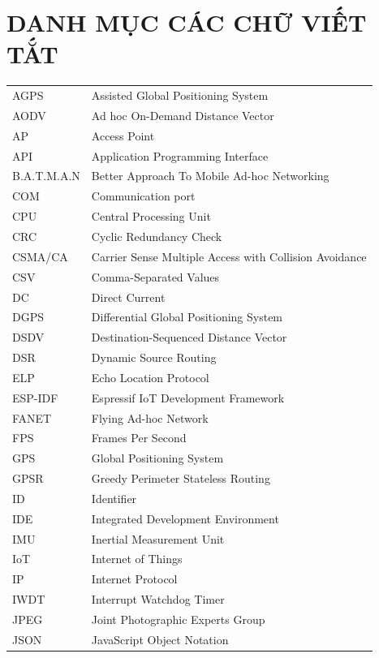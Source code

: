 \chapter*{DANH MỤC CÁC CHỮ VIẾT TẮT}
\begin{longtable}{@{}p{3.2cm}p{11.8cm}@{}}
AGPS & Assisted Global Positioning System \\
AODV & Ad hoc On-Demand Distance Vector \\
AP & Access Point \\
API & Application Programming Interface \\
B.A.T.M.A.N & Better Approach To Mobile Ad-hoc Networking \\
COM & Communication port \\
CPU & Central Processing Unit \\
CRC & Cyclic Redundancy Check \\
CSMA/CA & Carrier Sense Multiple Access with Collision Avoidance \\
CSV & Comma-Separated Values \\
DC & Direct Current \\
DGPS & Differential Global Positioning System \\
DSDV & Destination-Sequenced Distance Vector \\
DSR & Dynamic Source Routing \\
ELP & Echo Location Protocol \\
ESP-IDF & Espressif IoT Development Framework \\
FANET & Flying Ad-hoc Network \\
FPS & Frames Per Second \\
GPS & Global Positioning System \\
GPSR & Greedy Perimeter Stateless Routing \\
ID & Identifier \\
IDE & Integrated Development Environment \\
IMU & Inertial Measurement Unit \\
IoT & Internet of Things \\
IP & Internet Protocol \\
IWDT & Interrupt Watchdog Timer \\
JPEG & Joint Photographic Experts Group \\
JSON & JavaScript Object Notation \\

\end{longtable}
